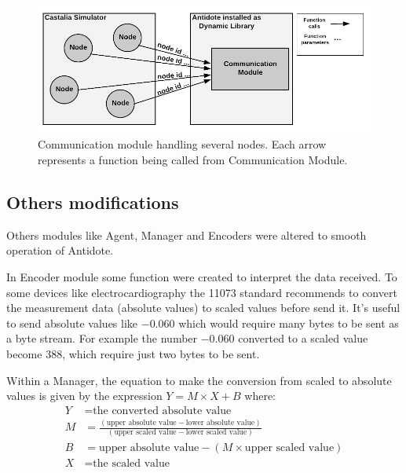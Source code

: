 \begin{figure}[htbp]
\centerline{\includegraphics[scale=0.31]{figures/communicationModule.png}}
\caption{Communication module handling several nodes. Each arrow represents a function being called from Communication Module.}
\label{fig:communicationModuleCastalia}
\end{figure}

\subsection{Others modifications}

Others modules like Agent, Manager and Encoders were altered to smooth operation of Antidote. 

In Encoder module some function were created to interpret the data received. To some devices like electrocardiography the 11073 standard \cite{b1} recommends to convert the measurement data (absolute values) to scaled values before send it. It's useful to send absolute values like $-0.060$  which would require many bytes to be sent as a byte stream. For example the number $-0.060$ converted to a scaled value become $388$, which require just two bytes to be sent.

Within a Manager, the equation to make the conversion from scaled to absolute values is given by the expression $Y = M \times X + B$ where:
\begin{align*}
    Y &= \text{the converted absolute value}\\
    M &= \frac{(\text{upper absolute value} - \text{lower absolute value})}{(\text{upper scaled value} - \text{lower scaled value})}\\
    B &= \text{upper absolute value} - (M \times \text{upper scaled value})\\
    X &= \text{the scaled value}
\end{align*}


